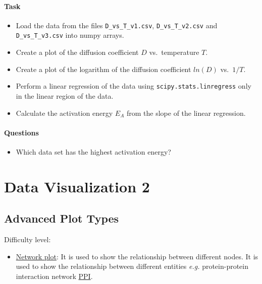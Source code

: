 \documentclass[
  letterpaper,
  DIV=11,
  numbers=noendperiod]{scrreprt}
\providecommand{\tightlist}{%
  \setlength{\itemsep}{0pt}\setlength{\parskip}{0pt}}\usepackage{longtable,booktabs,array}
\begin{document}
\subsection{Task}\label{task-4}

\begin{itemize}
\tightlist
\item
  Load the data from the files \texttt{D\_vs\_T\_v1.csv},
  \texttt{D\_vs\_T\_v2.csv} and \texttt{D\_vs\_T\_v3.csv} into numpy
  arrays.
\item
  Create a plot of the diffusion coefficient \(D\) vs.~temperature
  \(T\).
\item
  Create a plot of the logarithm of the diffusion coefficient \(ln(D)\)
  vs.~\(1/T\).
\item
  Perform a linear regression of the data using
  \texttt{scipy.stats.linregress} only in the linear region of the data.
\item
  Calculate the activation energy \(E_A\) from the slope of the linear
  regression.
\end{itemize}

\subsection{Questions}\label{questions-5}

\begin{itemize}
\tightlist
\item
  Which data set has the highest activation energy?
\end{itemize}

\part{Data Visualization 2}

\chapter{Advanced Plot Types}\label{advanced-plot-types}

Difficulty level: { }

\begin{itemize}
\tightlist
\item
  \href{https://networkx.org/documentation/stable/auto_examples/index.html}{Network
  plot}: It is used to show the relationship between different nodes. It
  is used to show the relationship between different entities
  \emph{e.g.} protein-protein interaction network
  \href{http://www.ncbi.nlm.nih.gov/pmc/articles/pmc4017556/}{PPI}.
\end{itemize}
\end{document}
